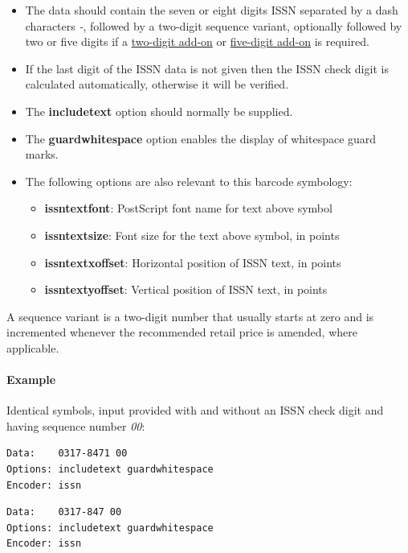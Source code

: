 \begin{itemize}
\tightlist
\item
  The data should contain the seven or eight digits ISSN separated by a
  dash characters \emph{-}, followed by a two-digit sequence variant,
  optionally followed by two or five digits if a
  \protect\hyperlink{ean-2}{two-digit add-on} or
  \protect\hyperlink{ean-5}{five-digit add-on} is required.
\item
  If the last digit of the ISSN data is not given then the ISSN check
  digit is calculated automatically, otherwise it will be verified.
\item
  The \textbf{includetext} option should normally be supplied.
\item
  The \textbf{guardwhitespace} option enables the display of whitespace
  guard marks.
\item
  The following options are also relevant to this barcode symbology:

  \begin{itemize}
  \tightlist
  \item
    \textbf{issntextfont}: PostScript font name for text above symbol
  \item
    \textbf{issntextsize}: Font size for the text above symbol, in
    points
  \item
    \textbf{issntextxoffset}: Horizontal position of ISSN text, in
    points
  \item
    \textbf{issntextyoffset}: Vertical position of ISSN text, in points
  \end{itemize}
\end{itemize}

A sequence variant is a two-digit number that usually starts at zero and
is incremented whenever the recommended retail price is amended, where
applicable.

\hypertarget{example}{%
\paragraph{Example}\label{example}}

Identical symbols, input provided with and without an ISSN check digit
and having sequence number \emph{00}:

\begin{verbatim}
Data:    0317-8471 00
Options: includetext guardwhitespace
Encoder: issn
\end{verbatim}

\begin{verbatim}
Data:    0317-847 00
Options: includetext guardwhitespace
Encoder: issn
\end{verbatim}

